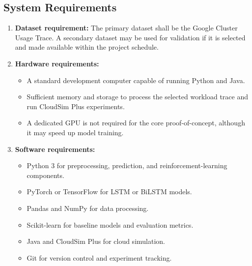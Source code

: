 \documentclass[12pt,a4paper]{report}
\begin{document}
\subsection{System Requirements}
\begin{enumerate}
    \item \textbf{Dataset requirement:} The primary dataset shall be the Google Cluster Usage Trace. A secondary dataset may be used for validation if it is selected and made available within the project schedule.
    \item \textbf{Hardware requirements:}
    \begin{itemize}
        \item A standard development computer capable of running Python and Java.
        \item Sufficient memory and storage to process the selected workload trace and run CloudSim Plus experiments.
        \item A dedicated GPU is not required for the core proof-of-concept, although it may speed up model training.
    \end{itemize}
    \item \textbf{Software requirements:}
    \begin{itemize}
        \item Python 3 for preprocessing, prediction, and reinforcement-learning components.
        \item PyTorch or TensorFlow for LSTM or BiLSTM models.
        \item Pandas and NumPy for data processing.
        \item Scikit-learn for baseline models and evaluation metrics.
        \item Java and CloudSim Plus for cloud simulation.
        \item Git for version control and experiment tracking.
    \end{itemize}
\end{enumerate}
\lipsum[40-41]
\end{document}
